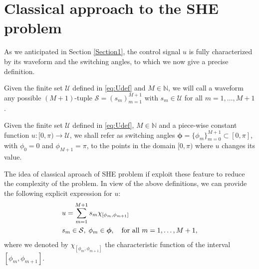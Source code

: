 
\section{Classical approach to the SHE problem}\label{sec:ClassicalSHEproblem}

As we anticipated in Section \ref{Section1}, the control signal $u$ is fully characterized by its waveform and the switching angles, to which we now give a precise definition. 
\vspace{1em}
\begin{definition}\label{def:waveform}
Given the finite set $\mathcal U$ defined in \eqref{eq:Udef} and $M\in\mathbb{N}$, we will call a waveform any possible $(M+1)$-tuple $\mathcal S = (s_m)_{m=1}^{M+1}$ with $s_m\in \mathcal U$ for all $m=1,\ldots,M+1$.
\end{definition}
\vspace{1em}
\begin{definition}\label{def:switchingAngles}
Given the finite set $\mathcal U$ defined in \eqref{eq:Udef}, $M\in\mathbb{N}$ and a piece-wise constant function $u:[0,\pi) \rightarrow \mathcal{U}$, we shall refer as switching angles $\bm{\phi} = \{\phi_m\}_{m=0}^{M+1}\subset[0,\pi]$, with $\phi_0 = 0$ and $\phi_{M+1} = \pi$, to the points in the domain $[0,\pi)$ where $u$ changes its value. 
\end{definition} 

The idea of classical aproach of SHE problem if exploit these feature to reduce the complexity of the problem. In view of the above definitions, we can provide the following explicit expression for $u$:
\begin{align}\label{eq:uExpl}
	&u = \sum_{m=1}^{M+1} s_m\chi_{[\phi_m,\phi_{m+1}]}
	\\
	&s_m\in\mathcal S, \;\phi_m\in{\bm{\phi}}, \quad \mbox{for all } m=1,\ldots,M+1, \notag 
\end{align} 
where we denoted by $\chi_{[\phi_m,\phi_{m+1}]}$ the characteristic function of the interval $[\phi_m,\phi_{m+1}]$.

